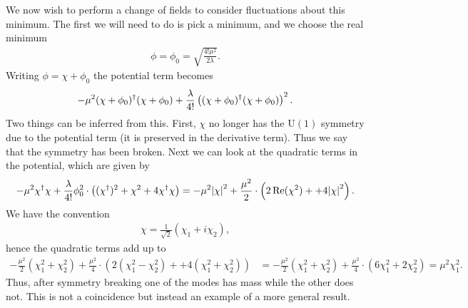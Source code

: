 We now wish to perform a change of fields to consider fluctuations about this minimum. The first we will need to do is pick a minimum, and we choose the real minimum
\begin{align*}
\phi = \phi_{0} = \sqrt{\frac{4!\mu^{2}}{2\lambda}}.
\end{align*}
Writing $\phi = \chi + \phi_{0}$ the potential term becomes
\begin{align*}
-\mu^{2}(\chi + \phi_{0})^{\dagger}(\chi + \phi_{0}) + \frac{\lambda}{4!}\left((\chi + \phi_{0})^{\dagger}(\chi + \phi_{0})\right)^{2}.
\end{align*}
Two things can be inferred from this. First, $\chi$ no longer has the $\text{U}(1)$ symmetry due to the potential term (it is preserved in the derivative term). Thus we say that the symmetry has been broken. Next we can look at the quadratic terms in the potential, which are given by
\begin{align*}
-\mu^{2}\chi^{\dagger}\chi + \frac{\lambda}{4!}\phi_{0}^{2}\cdot \left((\chi^{\dagger})^{2} + \chi^{2} + 4\chi^{\dagger}\chi\right) = -\mu^{2}\abs{\chi}^{2} + \frac{\mu^{2}}{2}\cdot \left(2\Re(\chi^{2}) +  + 4\abs{\chi}^{2}\right).
\end{align*}
We have the convention
\begin{align*}
\chi = \frac{1}{\sqrt{2}}(\chi_{1} + i\chi_{2}),
\end{align*}
hence the quadratic terms add up to
\begin{align*}
-\frac{\mu^{2}}{2}(\chi_{1}^{2} + \chi_{2}^{2}) + \frac{\mu^{2}}{4}\cdot \left(2(\chi_{1}^{2} - \chi_{2}^{2}) +  + 4(\chi_{1}^{2} + \chi_{2}^{2})\right) &= -\frac{\mu^{2}}{2}(\chi_{1}^{2} + \chi_{2}^{2}) + \frac{\mu^{2}}{4}\cdot \left(6\chi_{1}^{2} + 2\chi_{2}^{2}\right) = \mu^{2}\chi_{1}^{2}.
\end{align*}
Thus, after symmetry breaking one of the modes has mass while the other does not. This is not a coincidence but instead an example of a more general result.


